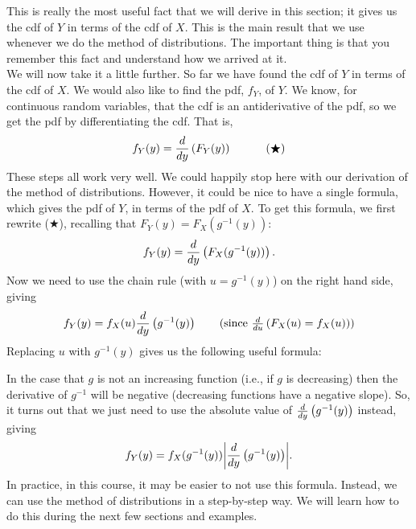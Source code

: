 \noindent This is really the most useful fact that we will derive in this section; it gives us the cdf of $Y$ in terms of the cdf of $X$. This is the main result that we use whenever we do the method of distributions. The important thing is that you remember this fact and understand how we arrived at it. \\

\noindent We will now take it a little further. So far we have found the cdf of $Y$ in terms of the cdf of $X$. We would also like to find the pdf, $f_Y$, of $Y$. We know, for continuous random variables, that the cdf is an antiderivative of the pdf, so we get the pdf by differentiating the cdf. That is,
\[
f_Y(y) = \frac{d}{dy}\left(F_Y(y)\right) \;\;\;\;\;\;\;\;\;\;\; (\bigstar)
\]
These steps all work very well. We could happily stop here with our derivation of the method of distributions. However, it could be nice to have a single formula, which gives the pdf of $Y$, in terms of the pdf of $X$. To get this formula, we first rewrite ($\bigstar$), recalling that $F_Y(y) = F_X(g^{-1}(y))$:
\[
f_Y(y) = \frac{d}{dy}\left(F_X(g^{-1}(y))\right).
\]
Now we need to use the chain rule (with $u = g^{-1}(y)$) on the right hand side, giving
\begin{align*}
f_Y(y) = f_X(u)\frac{d}{dy}\brac{g^{-1}(y)} \tag{since $\frac{d}{du}\brac{F_X(u) = f_X(u)}$}
\end{align*}
Replacing $u$ with $g^{-1}(y)$ gives us the following useful formula:

  	\bigskip
	
	\hfil{}
	\bigskip

\noindent In the case that $g$ is not an increasing function (i.e., if $g$ is decreasing) then the derivative of $g^{-1}$ will be negative (decreasing functions have a negative slope). So, it turns out that we just need to use the absolute value of $\frac{d}{dy}\left(g^{-1}(y)\right)$ instead, giving
\[
f_Y(y) = f_X(g^{-1}(y))\displaystyle{\left|\frac{d}{dy}\left(g^{-1}(y)\right)\right|}.
\]
In practice, in this course, it may be easier to not use this formula. Instead, we can use the method of distributions in a step-by-step way. We will learn how to do this during the next few sections and examples.

